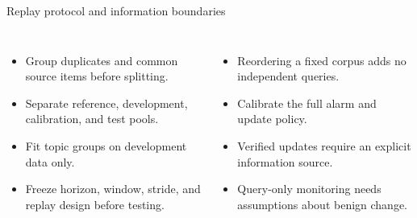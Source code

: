 \begin{frame}[t]{Replay protocol and information boundaries}
\vspace{0.3cm}
\begin{columns}[T,onlytextwidth]
{\small
\begin{itemize}\setlength\itemsep{0.45em}
\item Group duplicates and common source items before splitting.
\item Separate reference, development, calibration, and test pools.
\item Fit topic groups on development data only.
\item Freeze horizon, window, stride, and replay design before testing.
\end{itemize}}
{\small
\begin{itemize}\setlength\itemsep{0.45em}
\item Reordering a fixed corpus adds no independent queries.
\item Calibrate the full alarm and update policy.
\item Verified updates require an explicit information source.
\item Query-only monitoring needs assumptions about benign change.
\end{itemize}}
\end{columns}
\par\vspace{0.4cm}
\end{frame}

